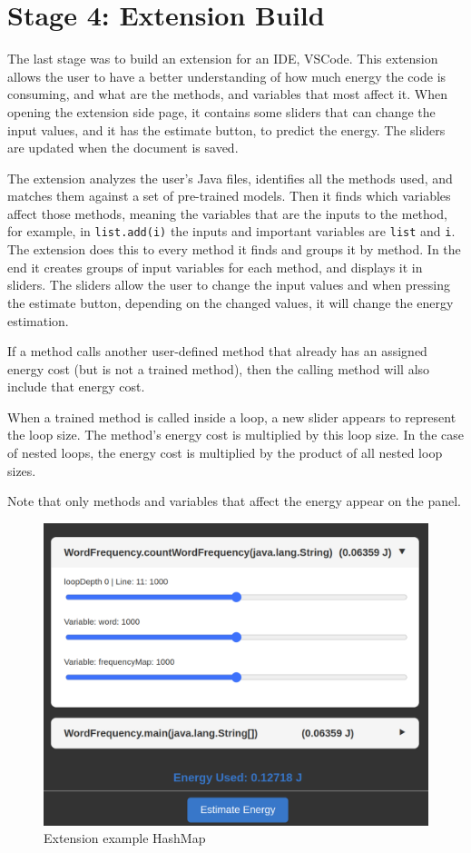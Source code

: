 \section{Stage 4: Extension Build} \label{sec:work_stage4_extension_build}

The last stage was to build an extension for an IDE, VSCode. This extension allows the user to have a better understanding of how much energy the code is consuming, and what are the methods, and variables that most affect it.
When opening the extension side page, it contains some sliders that can change the input values, and it has the estimate button, to predict the energy.
The sliders are updated when the document is saved.%

The extension analyzes the user's Java files, identifies all the methods used, and matches them against a set of pre-trained models. Then it finds which variables affect those methods, meaning the variables that are the inputs to the method, for example, in \texttt{list.add(i)}  the inputs and important variables are \texttt{list} and \texttt{i}.
The extension does this to every method it finds and groups it by method. In the end it creates groups of input variables for each method, and displays it in sliders. The sliders allow the user to change the input values and when pressing the estimate button, depending on the changed values, it will change the energy estimation.

If a method calls another user-defined method that already has an assigned energy cost (but is not a trained method), then the calling method will also include that energy cost.

When a trained method is called inside a loop, a new slider appears to represent the loop size. The method’s energy cost is multiplied by this loop size. In the case of nested loops, the energy cost is multiplied by the product of all nested loop sizes.

Note that only methods and variables that affect the energy appear on the panel.

\begin{figure}[htbp]
  \centering
  \includegraphics[width = .8 \textwidth]{figures/extension_example1.png}
  \caption{Extension example HashMap}
  \label{fig:extension_example1}
\end{figure}

